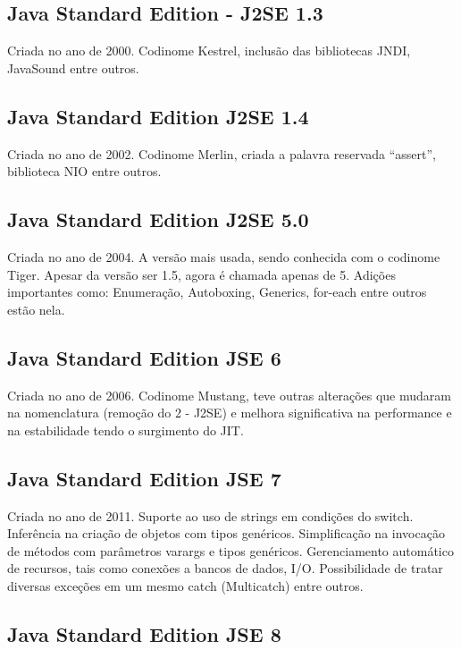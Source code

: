 \documentclass[
	12pt,				%
	openright,			%
	oneside,			%
	a4paper,			%
	english,			%
	french,				%
	spanish,			%
	brazil				%
	]{abntex2}
\begin{document}
\subsection{Java Standard Edition - J2SE 1.3}

Criada no ano de 2000.
Codinome Kestrel, inclusão das bibliotecas JNDI, JavaSound entre outros.


\subsection{Java Standard Edition J2SE 1.4}

Criada no ano de 2002.
Codinome Merlin, criada a palavra reservada “assert”, biblioteca NIO entre outros.


\subsection{Java Standard Edition J2SE 5.0}

Criada no ano de 2004.
A versão mais usada, sendo conhecida com o codinome Tiger. Apesar da versão ser 1.5, agora é chamada apenas de 5. Adições importantes como: Enumeração, Autoboxing, Generics, for-each entre outros estão nela.


\subsection{Java Standard Edition JSE 6}

Criada no ano de 2006.
Codinome Mustang, teve outras alterações que mudaram na nomenclatura (remoção do 2 - J2SE) e melhora significativa na performance e na estabilidade tendo o surgimento do JIT.


\subsection{Java Standard Edition JSE 7 }
Criada no ano de 2011.
Suporte ao uso de strings em condições do switch.
Inferência na criação de objetos com tipos genéricos.
Simplificação na invocação de métodos com parâmetros varargs e tipos genéricos.
Gerenciamento automático de recursos, tais como conexões a bancos de dados, I/O.
Possibilidade de tratar diversas exceções em um mesmo catch (Multicatch) entre outros.

\subsection{Java Standard Edition JSE 8 }
\end{document}
